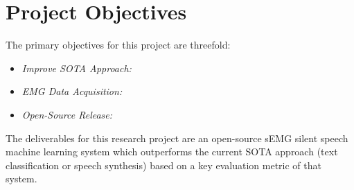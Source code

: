 \section{Project Objectives}

The primary objectives for this project are threefold:

\begin{itemize}
    \item \textit{Improve SOTA Approach:}
    \item \textit{EMG Data Acquisition:}
    \item \textit{Open-Source Release:}
\end{itemize}

The deliverables for this research project are an open-source
sEMG silent speech machine learning system which outperforms the current
SOTA approach (text classification or speech synthesis) based on a key
evaluation metric of that system.